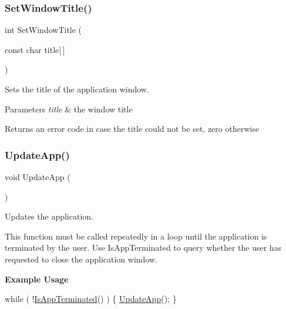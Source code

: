 \subsubsection{\texorpdfstring{Set\+Window\+Title()}{SetWindowTitle()}}
{\footnotesize\ttfamily int Set\+Window\+Title (\begin{DoxyParamCaption}\item[{const char}]{title\mbox{[}$\,$\mbox{]} }\end{DoxyParamCaption})}

Sets the title of the application window.


\begin{DoxyParams}{Parameters}
{\em title} & the window title \\
\hline
\end{DoxyParams}
\begin{DoxyReturn}{Returns}
an error code in case the title could not be set, zero otherwise 
\end{DoxyReturn}
\mbox{\label{group__sdl__group_ga9bf9bfe01e7d336c3a3b13cc923ff850}} 
\subsubsection{\texorpdfstring{Update\+App()}{UpdateApp()}}
{\footnotesize\ttfamily void Update\+App (\begin{DoxyParamCaption}{ }\end{DoxyParamCaption})}

Updates the application.

This function must be called repeatedly in a loop until the application is terminated by the user. Use Is\+App\+Terminated to query whether the user has requested to close the application window.

{\bfseries Example Usage}


\begin{DoxyCode}
\textcolor{keywordflow}{while} ( !\hyperlink{group__sdl__group_ga6d29aa641d22a0299da4710022c8c96b}{IsAppTerminated}() ) \{
  \hyperlink{group__sdl__group_ga9bf9bfe01e7d336c3a3b13cc923ff850}{UpdateApp}();
\}
\end{DoxyCode}
 